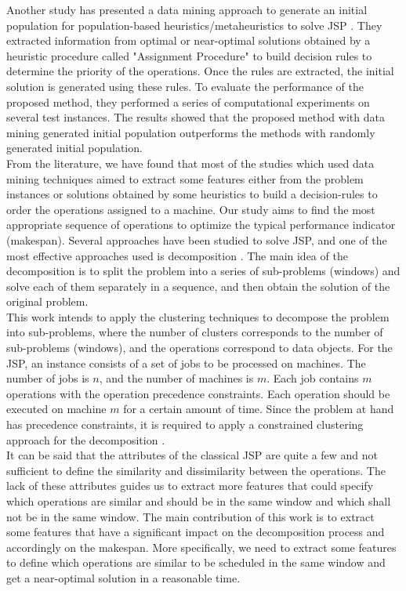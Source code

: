 \documentclass[runningheads]{llncs}
\begin{document}
Another study has presented a data mining approach to generate an initial population for population-based heuristics/metaheuristics to solve JSP \cite{nasiri2019data}. They extracted information from optimal or near-optimal solutions obtained by a heuristic procedure called "Assignment Procedure" to build decision rules to determine the priority of the operations. Once the rules are extracted, the initial solution is generated using these rules. To evaluate the performance of the proposed method, they performed a series of computational experiments on several test instances. The results showed that the proposed method with data mining generated initial population outperforms the methods with randomly generated initial population.\\

From the literature, we have found that most of the studies which used data mining techniques aimed to extract some features either from the problem instances or solutions obtained by some heuristics to build a decision-rules to order the operations assigned to a machine. Our study aims to  find the most appropriate sequence of operations to optimize the typical performance indicator (makespan). Several approaches have been studied to solve JSP, and one of the most effective approaches used is decomposition \cite{zhang2010hybrid,zhai2014decomposition}. The main idea of the decomposition is to split the problem into a series of sub-problems (windows) and solve each of them separately in a sequence, and then obtain the solution of the original problem.\\

This work intends to apply the clustering techniques to decompose the problem into sub-problems, where the number of clusters corresponds to the number of sub-problems (windows), and the operations correspond to data objects. For the JSP, an instance consists of a set of jobs to be processed on machines. The number of jobs is $n$, and the number of machines is $m$. Each job contains $m$ operations with the operation precedence constraints. Each operation should be executed on machine $m$ for a certain amount of time. Since the problem at hand has precedence constraints, it is required to apply a constrained clustering approach for the decomposition \cite{wagstaff2001constrained}.\\

It can be said that the attributes of the classical JSP are quite a few and not sufficient to define the similarity and dissimilarity between the operations. The lack of these attributes guides us to extract more features that could specify which operations are similar and should be in the same window and which shall not be in the same window. The main contribution of this work is to extract some features that have a significant impact on the decomposition process and accordingly on the makespan. 
More specifically, we need to extract some features to define which operations are similar to be scheduled in the same window and get a near-optimal solution in a reasonable time. \\
\end{document}

